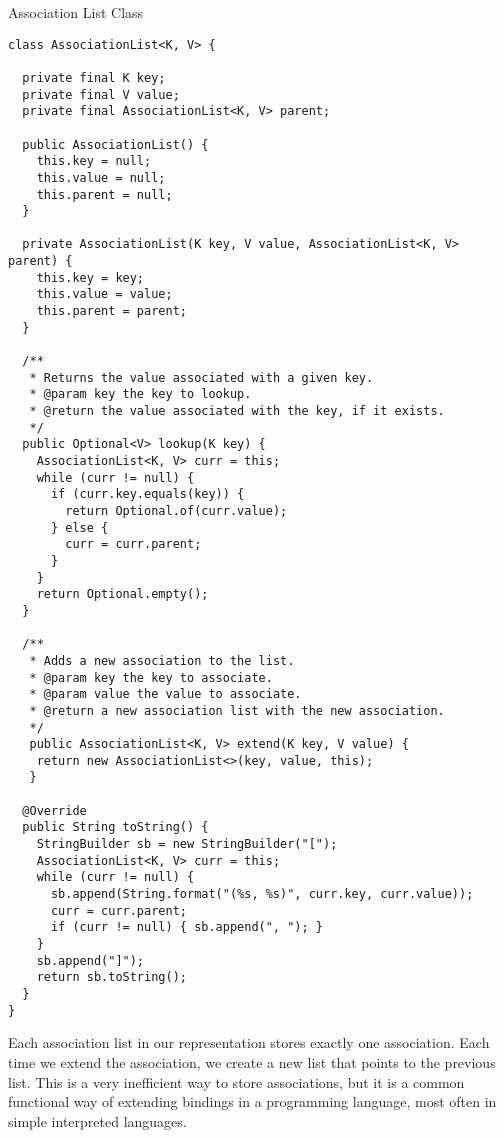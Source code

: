 \begin{cl}[]{Association List Class}
\begin{lstlisting}[language=MyJava]
class AssociationList<K, V> {
  
  private final K key;
  private final V value;
  private final AssociationList<K, V> parent;
  
  public AssociationList() {
    this.key = null;
    this.value = null;
    this.parent = null;
  }

  private AssociationList(K key, V value, AssociationList<K, V> parent) {
    this.key = key;
    this.value = value;
    this.parent = parent;
  }
  
  /**
   * Returns the value associated with a given key.
   * @param key the key to lookup.
   * @return the value associated with the key, if it exists.
   */
  public Optional<V> lookup(K key) {
    AssociationList<K, V> curr = this;
    while (curr != null) {
      if (curr.key.equals(key)) {
        return Optional.of(curr.value);
      } else {
        curr = curr.parent;
      }
    }
    return Optional.empty();
  }
  
  /**
   * Adds a new association to the list.
   * @param key the key to associate.
   * @param value the value to associate.
   * @return a new association list with the new association.
   */
   public AssociationList<K, V> extend(K key, V value) {
    return new AssociationList<>(key, value, this);
   }
  
  @Override
  public String toString() {
    StringBuilder sb = new StringBuilder("[");
    AssociationList<K, V> curr = this;
    while (curr != null) {
      sb.append(String.format("(%s, %s)", curr.key, curr.value));
      curr = curr.parent;
      if (curr != null) { sb.append(", "); }
    }
    sb.append("]");
    return sb.toString();
  }
}
\end{lstlisting}
\end{cl}

Each association list in our representation stores exactly one association. Each time we extend the association, we create a new list that points to the previous list. This is a very inefficient way to store associations, but it is a common functional way of extending bindings in a programming language, most often in simple interpreted languages.